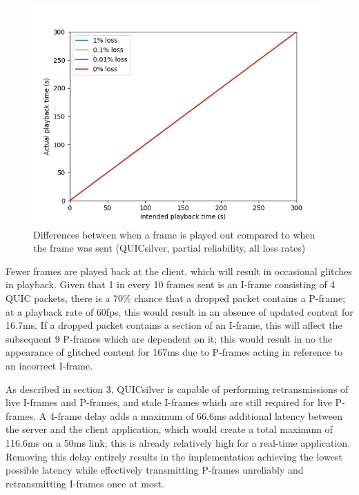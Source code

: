 \documentclass{mpaper}
\begin{document}
\begin{figure}[h]
\includegraphics[scale=0.5]{images/graphics-partial/50ms-relative-offsets-combined-PARTIAL.png}
\centering
\caption{Differences between when a frame is played out compared to when the frame was sent (QUICsilver, partial reliability, all loss rates)}
\label{playback-par}
\end{figure}

Fewer frames are played back at the client, which will result in occasional glitches in playback. Given that 1 in every 10 frames sent is an I-frame consisting of 4 QUIC packets, there is a 70\% chance that a dropped packet contains a P-frame; at a playback rate of 60fps, this would result in an absence of updated content for 16.7ms. If a dropped packet contains a section of an I-frame, this will affect the subsequent 9 P-frames which are dependent on it; this would result in no the appearance of glitched content for 167ms due to P-frames acting in reference to an incorrect I-frame.


As described in section 3, QUICsilver is capable of performing retransmissions of live I-frames and P-frames, and stale I-frames which are still required for live P-frames. A 4-frame delay adds a maximum of 66.6ms additional latency between the server and the client application, which would create a total maximum of 116.6ms on a 50ms link; this is already relatively high for a real-time application. Removing this delay entirely results in the implementation achieving the lowest possible latency while effectively transmitting P-frames unreliably and retransmitting I-frames once at most.
\end{document}
